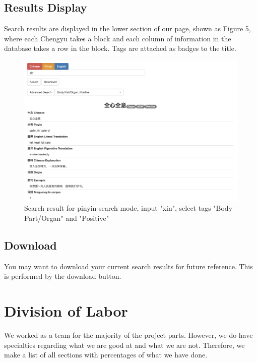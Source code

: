 \documentclass[11pt]{article} %
\begin{document}
\subsection{Results Display}

\indent Search results are displayed in the lower section of our page, shown as Figure 5, where each Chengyu takes a block and each column of information in the database takes a row in the block. Tags are attached as badges to the title.

\begin{figure}[htbp]
\begin{center}
\includegraphics[width=16cm]{result.png}
\caption{Search result for pinyin search mode, input "xin", select tags "Body Part/Organ" and "Positive"}
\label{default}
\end{center}
\end{figure}

\subsection{Download}
You may want to download your current search results for future reference. This is performed by the download button. 

\section{Division of Labor}

\indent We worked as a team for the majority of the project parts. However, we do have specialties regarding what we are good at and what we are not. Therefore, we make a list of all sections with percentages of what we have done.
\end{document}
